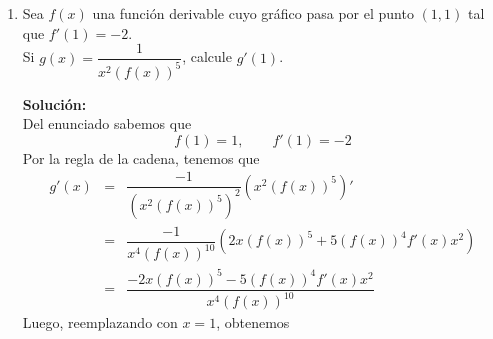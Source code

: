 \documentclass[12pt]{article}
\newenvironment{solucion}
{\begin{mdframed}[backgroundcolor=black!10]
		{\bf Solución:}\\
	}
	{
	\end{mdframed}
}
\newenvironment{preguntas}
{\begin{enumerate}\itemsep12pt
	}
	{
	\end{enumerate}
}
\begin{document}
\begin{preguntas}
\begin{solucion}
\begin{enumerate}[a)]
$$\begin{array}{rcl}
	f'(x) & = & 5^x ln(5) cos(3x) + 5^x (-\sin 3x)3 \\
	f'(x) & = & ln(5)5^x cos(3x) - 3\cdot 5^x \sin 3x
	\end{array}$$
\end{enumerate}
\end{solucion}
\item Sea $f(x)$ una función derivable cuyo gráfico pasa por el punto $(1,1)$ tal que $f'(1) = -2$.\\
Si $g(x) = \dfrac{1}{x^2(f(x))^5}$, calcule $g'(1)$.
\begin{solucion}
Del enunciado sabemos que
$$f(1) = 1, \qquad f'(1) = -2$$
Por la regla de la cadena, tenemos que
$$\begin{array}{rcl}
g'(x) & = & \dfrac{-1}{(x^2(f(x))^5)^2}(x^2(f(x))^5)'\\
& = & \dfrac{-1}{x^4(f(x))^{10}}(2x(f(x))^5 + 5(f(x))^4f'(x)x^2)\\
& = & \dfrac{-2x(f(x))^5 - 5(f(x))^4f'(x)x^2}{x^4(f(x))^{10}}
\end{array}$$
Luego, reemplazando con $x=1$, obtenemos


\end{solucion}
\end{preguntas}
\end{document}
